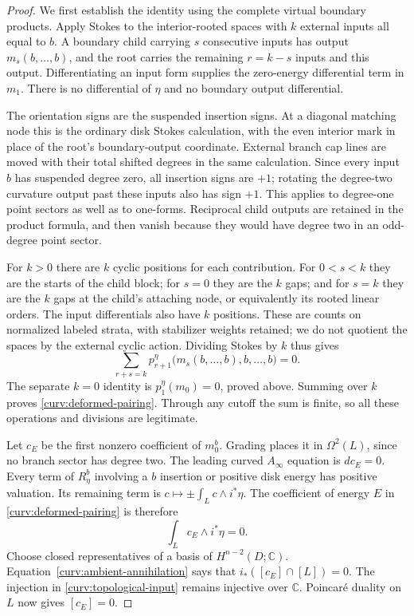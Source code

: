 \documentclass[11pt]{article}
\numberwithin{equation}{section}
\theoremstyle{definition}
\theoremstyle{remark}
\begin{document}
\begin{proof}
We first establish the identity using the complete virtual boundary
products.  Apply Stokes to the interior-rooted spaces with $k$
external inputs all equal to $b$.  A boundary child carrying $s$
consecutive inputs has output $m_s(b,\ldots,b)$, and the root carries
the remaining $r=k-s$ inputs and this output.  Differentiating an
input form supplies the zero-energy differential term in $m_1$.
There is no differential of $\eta$ and no boundary output
differential.

The orientation signs are the suspended insertion signs.  At a
diagonal matching node this is the ordinary disk Stokes calculation,
with the even interior mark in place of the root's boundary-output
coordinate.  External branch cap lines are moved with their total
shifted degrees in the same calculation.  Since every input $b$
has suspended degree zero, all insertion signs are $+1$; rotating
the degree-two curvature output past these inputs also has sign
$+1$.  This applies to degree-one point sectors as well as to
one-forms.  Reciprocal child outputs are retained in the product
formula, and then vanish because they would have degree two in an
odd-degree point sector.

For $k>0$ there are $k$ cyclic positions for each contribution.
For $0<s<k$ they are the starts of the child block; for $s=0$ they
are the $k$ gaps; and for $s=k$ they are the $k$ gaps at the child's
attaching node, or equivalently its rooted linear orders.  The
input differentials also have $k$ positions.  These are counts on
normalized labeled strata, with stabilizer weights retained; we
do not quotient the spaces by the external cyclic action.
Dividing Stokes by $k$ thus gives
\[
 \sum_{r+s=k}
 p_{r+1}^\eta\bigl(m_s(b,\ldots,b),b,\ldots,b\bigr)=0.
\]
The separate $k=0$ identity is $p_1^\eta(m_0)=0$, proved above.
Summing over $k$ proves \eqref{curv:deformed-pairing}.  Through any
cutoff the sum is finite, so all these operations and divisions are
legitimate.

Let $c_E$ be the first nonzero coefficient of $m_0^b$.  Grading
places it in $\Omega^2(L)$, since no branch sector has degree two.
The leading curved $A_\infty$ equation is $dc_E=0$.  Every term
of $R_\eta^b$ involving a $b$ insertion or positive disk energy has
positive valuation.  Its remaining term is
$c\mapsto\pm\int_L c\wedge i^*\eta$.  The coefficient of energy
$E$ in \eqref{curv:deformed-pairing} is therefore
\begin{equation}\label{curv:ambient-annihilation}
 \int_L c_E\wedge i^*\eta=0.
\end{equation}
Choose closed representatives of a basis of $H^{n-2}(D;\mathbb C)$.
Equation~\eqref{curv:ambient-annihilation} says that
$i_*([c_E]\cap[L])=0$.  The injection in
\eqref{curv:topological-input} remains injective over $\mathbb C$.
Poincar\'e duality on $L$ now gives $[c_E]=0$.
\end{proof}
\end{document}
